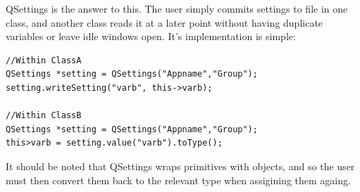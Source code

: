 \documentclass[11pt]{article} %
\begin{document}
QSettings is the answer to this. The user simply commits settings to file in one class, and another class reads it at a later point without having duplicate variables or leave idle windows open.
It's implementation is simple:
\begin{lstlisting}
//Within ClassA
QSettings *setting = QSettings("Appname","Group");
setting.writeSetting("varb", this->varb);

//Within ClassB
QSettings *setting = QSettings("Appname","Group");
this>varb = setting.value("varb").toType();
\end{lstlisting}
It should be noted that QSettings wraps primitives with objects, and so the user must then convert them back to the relevant type when assigining them againg.
\end{document}
